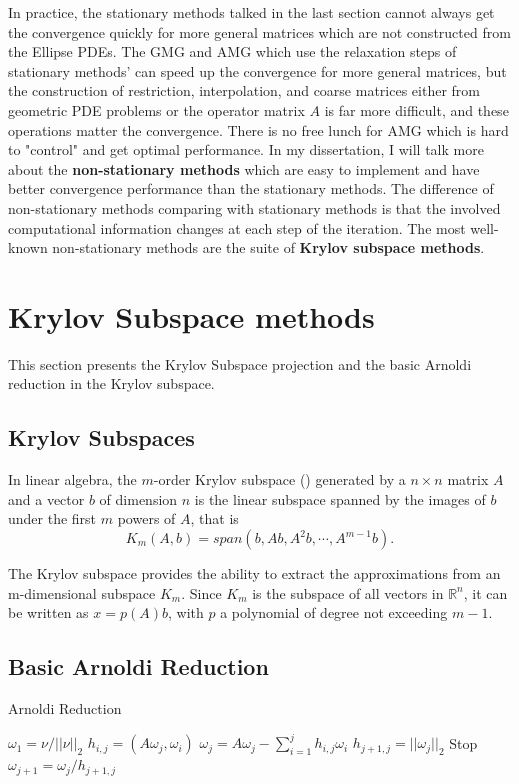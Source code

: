 In practice, the stationary methods talked in the last section cannot always get the convergence quickly for more general matrices which are not constructed from the Ellipse PDEs. The GMG and AMG which use the relaxation steps of stationary methods' can speed up the convergence for more general matrices, but the construction of restriction, interpolation, and coarse matrices either from geometric PDE problems or the operator matrix $A$ is far more difficult, and these operations matter the convergence. There is no free lunch for AMG which is hard to "control" and get optimal performance. In my dissertation, I will talk more about the \textbf{non-stationary methods} which are easy to implement and have better convergence performance than the stationary methods. The difference of non-stationary methods comparing with stationary methods is that the involved computational information changes at each step of the iteration. The most well-known non-stationary methods are the suite of \textbf{Krylov subspace methods}.

\section{Krylov Subspace methods}

This section presents the Krylov Subspace projection and the basic Arnoldi reduction in the Krylov subspace.

\subsection{Krylov Subspaces}
In linear algebra, the $m$-order Krylov subspace (\cite{saad1981krylov}) generated by a $n\times n$ matrix $A$ and a vector $b$ of dimension $n$ is the linear subspace spanned by the images of $b$ under the first $m$ powers of $A$, that is 
\[K_m(A,b)=span (b, Ab, A^2b,\cdots, A^{m-1}b).\] 

The Krylov subspace provides the ability to extract the approximations from an m-dimensional subspace $K_m$. Since $K_m$ is the subspace of all vectors in $\mathbb{R}^n$, it can be written as $x=p(A)b$, with $p$ a polynomial of degree not exceeding $m-1$.

\subsection{Basic Arnoldi Reduction}

\begin{algorithm}[htbp]{}
	\caption{Arnoldi Reduction}   
	\label{alg:arnoldi-reduction}   
	\begin{algorithmic}[1]
		\State $\omega_1=\nu /||\nu||_2$
		\State $h_{i,j}=(A\omega_j,\omega_i)$
		\EndFor
		\State $\omega_j=A\omega_j-\sum_{i=1}^jh_{i,j}\omega_i$
		\State $h_{j+1,j}=||\omega_j||_2$
		 Stop
		\EndIf
		\State $\omega_{j+1}=\omega_j/h_{j+1,j}$
		\EndFor 
		\EndFunction
	\end{algorithmic}  
\end{algorithm}

